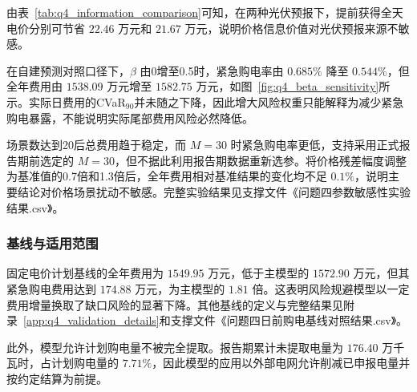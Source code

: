 由表~\ref{tab:q4_information_comparison}可知，在两种光伏预报下，提前获得全天电价分别可节省 \(22.46\) 万元和 \(21.67\) 万元，说明价格信息价值对光伏预报来源不敏感。

在自建预测对照口径下，\(\beta\) 由0增至0.5时，紧急购电率由 \(0.685\%\) 降至 \(0.544\%\)，但全年费用由 \(1538.09\) 万元增至 \(1582.75\) 万元，如图~\ref{fig:q4_beta_sensitivity}所示。实际日费用的CVaR$_{90}$并未随之下降，因此增大风险权重只能解释为减少紧急购电暴露，不能说明实际尾部费用风险必然降低。

场景数达到20后总费用趋于稳定，而 \(M=30\) 时紧急购电率更低，支持采用正式报告期前选定的 \(M=30\)，但不据此利用报告期数据重新选参。将价格残差幅度调整为基准值的0.7倍和1.3倍后，全年费用相对基准结果的变化均不足 \(0.1\%\)，说明主要结论对价格场景扰动不敏感。完整实验结果见支撑文件《问题四参数敏感性实验结果.csv》。

\subsubsection{基线与适用范围}

固定电价计划基线的全年费用为 \(1549.95\) 万元，低于主模型的 \(1572.90\) 万元，但其紧急购电费用达到 \(174.88\) 万元，为主模型的 \(1.81\) 倍。这表明风险规避模型以一定费用增量换取了缺口风险的显著下降。其他基线的定义与完整结果见附录~\ref{app:q4_validation_details}和支撑文件《问题四日前购电基线对照结果.csv》。

此外，模型允许计划购电量不被完全提取。报告期累计未提取电量为 \(176.40\) 万千瓦时，占计划购电量的 \(7.71\%\)，因此模型的应用以外部电网允许削减已申报电量并按约定结算为前提。

